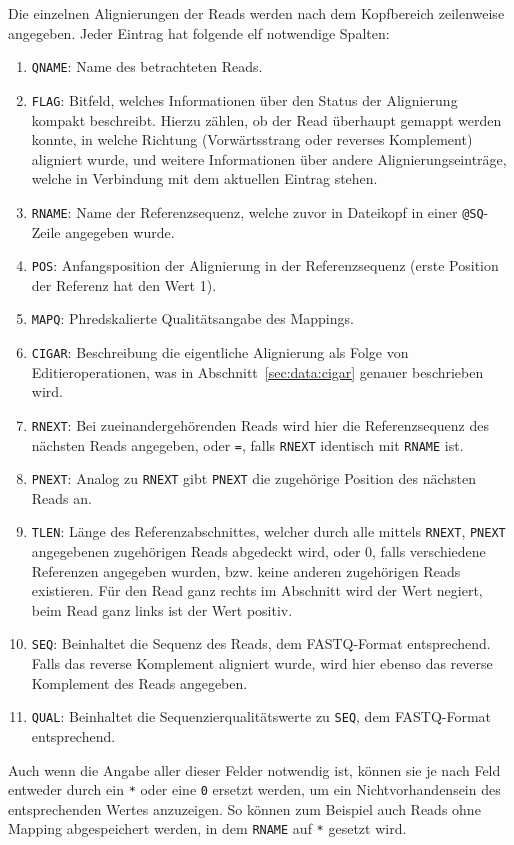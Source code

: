 Die einzelnen Alignierungen der Reads werden nach dem Kopfbereich zeilenweise angegeben.
Jeder Eintrag hat folgende elf notwendige Spalten:
\begin{enumerate}
\item \texttt{QNAME}: Name des betrachteten Reads.
\item \texttt{FLAG}: Bitfeld, welches Informationen über den Status der Alignierung kompakt beschreibt. Hierzu zählen, ob der Read überhaupt gemappt werden konnte, in welche Richtung (Vorwärtsstrang oder reverses Komplement) aligniert wurde, und weitere Informationen über andere Alignierungseinträge, welche in Verbindung mit dem aktuellen Eintrag stehen.
\item \texttt{RNAME}: Name der Referenzsequenz, welche zuvor in Dateikopf in einer \texttt{@SQ}-Zeile angegeben wurde.
\item \texttt{POS}: Anfangsposition der Alignierung in der Referenzsequenz (erste Position der Referenz hat den Wert 1).
\item \texttt{MAPQ}: Phredskalierte Qualitätsangabe des Mappings.
\item \texttt{CIGAR}: Beschreibung die eigentliche Alignierung als Folge von Editieroperationen, was in Abschnitt~\ref{sec:data:cigar} genauer beschrieben wird.
\item \texttt{RNEXT}: Bei zueinandergehörenden Reads wird hier die Referenzsequenz des nächsten Reads angegeben, oder \texttt{=}, falls \texttt{RNEXT} identisch mit \texttt{RNAME} ist.
\item \texttt{PNEXT}: Analog zu \texttt{RNEXT} gibt \texttt{PNEXT} die zugehörige Position des nächsten Reads an.
\item \texttt{TLEN}: Länge des Referenzabschnittes, welcher durch alle mittels \texttt{RNEXT}, \texttt{PNEXT} angegebenen zugehörigen Reads abgedeckt wird, oder 0, falls verschiedene Referenzen angegeben wurden, bzw. keine anderen zugehörigen Reads existieren. Für den Read ganz rechts im Abschnitt wird der Wert negiert, beim Read ganz links ist der Wert positiv.
\item \texttt{SEQ}: Beinhaltet die Sequenz des Reads, dem FASTQ-Format entsprechend. Falls das reverse Komplement aligniert wurde, wird hier ebenso das reverse Komplement des Reads angegeben.
\item \texttt{QUAL}: Beinhaltet die Sequenzierqualitätswerte zu \texttt{SEQ}, dem FASTQ-Format entsprechend.
\end{enumerate}
Auch wenn die Angabe aller dieser Felder notwendig ist, können sie je nach Feld entweder durch ein \texttt{*} oder eine \texttt{0} ersetzt werden, um ein Nichtvorhandensein des entsprechenden Wertes anzuzeigen.
So können zum Beispiel auch Reads ohne Mapping abgespeichert werden, in dem \texttt{RNAME} auf \texttt{*} gesetzt wird.

